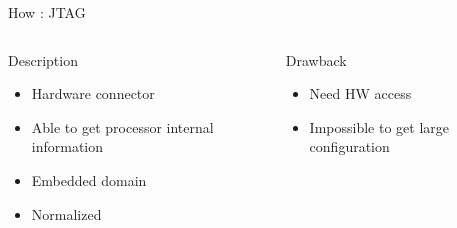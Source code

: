 %
\begin{Frame}{How : JTAG}
  \begin{columns}[t]
    \begin{column}{5cm} %
      \begin{block}{Description}
        \begin{itemize}
        \item Hardware connector
        \item Able to get processor internal information
        \item Embedded domain
        \item Normalized
        \end{itemize}
      \end{block} 
    \end{column}
    
    \begin{column}{5cm} %
      \begin{alertblock}{Drawback}
        \begin{itemize}
        \item Need HW access
        \item Impossible to get large configuration
        \end{itemize}
      \end{alertblock}   
    \end{column}
  \end{columns}  
\end{Frame}


